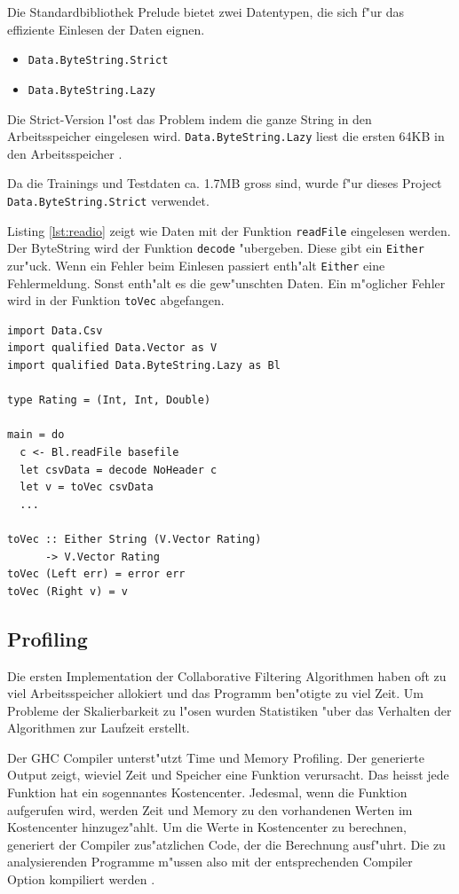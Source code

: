 \documentclass[a4paper, 12pt]{article}
\begin{document}
Die Standardbibliothek Prelude bietet zwei Datentypen, die sich f"ur das effiziente Einlesen der Daten eignen.

\begin{itemize}
\item \verb|Data.ByteString.Strict|
\item \verb|Data.ByteString.Lazy|
\end{itemize}

 Die Strict-Version l"ost das Problem indem die ganze String in den Arbeitsspeicher eingelesen wird. \verb|Data.ByteString.Lazy| liest die ersten 64KB in den Arbeitsspeicher \cite{Lipovaca}.

Da die Trainings und Testdaten ca. 1.7MB gross sind, wurde f"ur dieses Project \verb|Data.ByteString.Strict| verwendet.

Listing \ref{lst:readio} zeigt wie Daten mit der Funktion \verb|readFile| eingelesen werden. Der ByteString wird der Funktion \verb|decode| "ubergeben. Diese gibt ein \verb|Either| zur"uck. Wenn ein Fehler beim Einlesen passiert enth"alt \verb|Either| eine Fehlermeldung. Sonst enth"alt es die gew"unschten Daten. Ein m"oglicher Fehler wird in der Funktion \verb|toVec| abgefangen.

\begin{lstlisting}[label={lst:readio},caption={Einlesen von Files mit ByteString}]
import Data.Csv
import qualified Data.Vector as V
import qualified Data.ByteString.Lazy as Bl

type Rating = (Int, Int, Double)

main = do
  c <- Bl.readFile basefile
  let csvData = decode NoHeader c
  let v = toVec csvData
  ...

toVec :: Either String (V.Vector Rating)
      -> V.Vector Rating
toVec (Left err) = error err
toVec (Right v) = v
\end{lstlisting}

\subsection{Profiling}
\label{sec:profiling}

Die ersten Implementation der Collaborative Filtering Algorithmen haben oft zu viel Arbeitsspeicher allokiert und das Programm ben"otigte zu viel Zeit. Um Probleme der Skalierbarkeit zu l"osen wurden Statistiken "uber das Verhalten der Algorithmen zur Laufzeit erstellt.

Der GHC Compiler unterst"utzt Time und Memory Profiling. Der generierte Output zeigt, wieviel Zeit und Speicher eine Funktion verursacht. Das heisst jede Funktion hat ein sogennantes Kostencenter. Jedesmal, wenn die Funktion aufgerufen wird, werden Zeit und Memory zu den vorhandenen Werten im Kostencenter hinzugez"ahlt. Um die Werte in Kostencenter zu berechnen, generiert der Compiler zus"atzlichen Code, der die Berechnung ausf"uhrt. Die zu analysierenden Programme m"ussen also mit der entsprechenden Compiler Option kompiliert werden \cite{Mena}.
\end{document}
